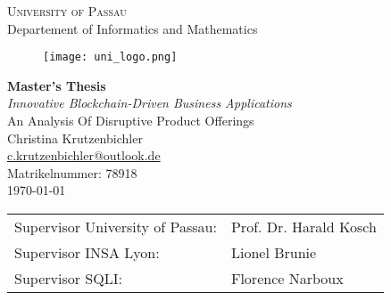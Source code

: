 \begin{center}
\vspace{3cm}
\textsc{University of Passau}\\
Departement of Informatics and Mathematics\\
\begin{figure}[h]
    \centering
    \texttt{[image: uni\_logo.png]}
    \label{encryption}
\end{figure}
\end{center}
\vspace{3cm}
\begin{center}
{\large\textbf{Master's Thesis}}\vspace{.5cm}\\
{\LARGE \textit{\glqq Innovative Blockchain-Driven Business Applications\grqq}}\vspace{0.5cm}\\
{\large An Analysis Of Disruptive Product Offerings}\\
\vspace{2cm}
{\large Christina Krutzenbichler}\\\href{mailto:c.krutzenbichler@outlook.de}{c.krutzenbichler@outlook.de} \\
Matrikelnummer: 78918 \\
\today
\end{center}
\vfill
\begin{tabular}{ll}
Supervisor University of Passau: & Prof. Dr. Harald Kosch \\
Supervisor INSA Lyon: & Lionel Brunie\\
Supervisor SQLI: & Florence Narboux 
\end{tabular}
